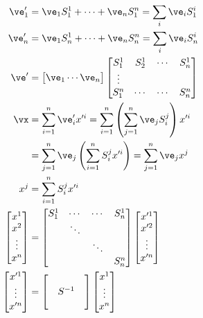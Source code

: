 \documentclass[cplx.tex]{subfiles}
\begin{document}
\begin{align}
    \ve'_1 &= \ve_1 S^1_1 + \cdots + \ve_n S^n_1 = \sum_i \ve_i S^i_1 \\
    \ve'_n &= \ve_1 S^1_n + \cdots + \ve_n S^n_n = \sum_i \ve_i S^i_n \\
    \ve' &= \begin{bmatrix} \ve_1 \cdots \ve_n \end{bmatrix}\begin{bmatrix} S^1_1 & S^1_2 & \cdots & S^1_n \\ \vdots & & & \\ S^n_1 & \cdots & \cdots & S^n_n \end{bmatrix} \\
    \vx &= \sum_{i=1}^n \ve'_i x'^i = \sum_{i=1}^n \left(\sum_{j=1}^n \ve_j S^j_i\right) x'^i \\
        &= \sum_{j=1}^n \ve_j \left(\sum_{i=1}^n S^j_i x'^i\right) = \sum_{j=1}^n \ve_j x^j \\
    x^j &= \sum_{i=1}^n S^j_i x'^i \\
    \begin{bmatrix} x^1 \\ x^2 \\ \vdots \\ x^n \end{bmatrix} &= \begin{bmatrix} S^1_1 & \cdots & \cdots & S^1_n \\ & \ddots & & \\ & & \ddots & \\ & & & S^n_n \end{bmatrix}\begin{bmatrix} x'^1 \\ x'^2 \\ \vdots \\ x'^n\end{bmatrix}  \\
    \begin{bmatrix} x'^1 \\ \vdots \\ x'^n \end{bmatrix} &= \begin{bmatrix} & & \\ & S^{-1} & \\ & & \end{bmatrix} \begin{bmatrix} x^1 \\ \vdots \\ x^n \end{bmatrix}
\end{align}
\end{document}
